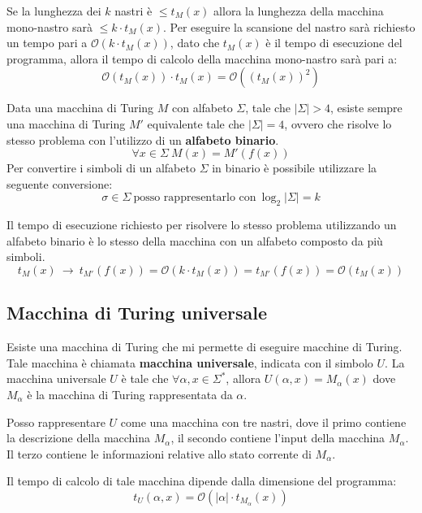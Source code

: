 Se la lunghezza dei $k$ nastri è $\leq t_M(x)$ allora la lunghezza della macchina mono-nastro sarà $\leq k \cdot t_M(x)$. Per eseguire la scansione del nastro sarà richiesto un tempo pari a $\mathcal{O}(k \cdot t_M(x))$, dato che $t_M(x)$ è il tempo di esecuzione del programma, allora il tempo di calcolo della macchina mono-nastro sarà pari a: 
\begin{equation}
    \mathcal{O}(t_M(x)) \cdot t_M(x) = \mathcal{O}((t_M(x))^2)
\end{equation}

Data una macchina di Turing $M$ con alfabeto $\Sigma$, tale che $|\Sigma| > 4$, esiste sempre una macchina di Turing $M'$ equivalente tale che $|\Sigma| = 4$, ovvero che risolve lo stesso problema con l'utilizzo di un \textbf{alfabeto binario}.
\begin{equation}
    \forall x \in \Sigma \ M(x) = M'(f(x))
\end{equation}
Per convertire i simboli di un alfabeto $\Sigma$ in binario è possibile utilizzare la seguente conversione:
\begin{equation}
    \sigma \in \Sigma \ \text{posso rappresentarlo con} \ \log_{2}|\Sigma | = k
\end{equation}

Il tempo di esecuzione richiesto per risolvere lo stesso problema utilizzando un alfabeto binario è lo stesso della macchina con un alfabeto composto da più simboli.
\begin{equation}
    t_M(x) \ \to \ t_{M'}(f(x)) = \mathcal{O}(k \cdot t_M(x)) = t_{M'}(f(x)) = \mathcal{O}(t_M(x))
\end{equation}
\subsection{Macchina di Turing universale}
Esiste una macchina di Turing che mi permette di eseguire macchine di Turing. Tale macchina è chiamata \textbf{macchina universale}, indicata con il simbolo $U$. La macchina universale $U$ è tale che $\forall \alpha, x \in \Sigma^{\ast}$, allora $U(\alpha, x) = M_{\alpha}(x)$ dove $M_{\alpha}$ è la macchina di Turing rappresentata da $\alpha$.

Posso rappresentare $U$ come una macchina con tre nastri, dove il primo contiene la descrizione della macchina $M_{\alpha}$, il secondo contiene l'input della macchina $M_{\alpha}$. Il terzo contiene le informazioni relative allo stato corrente di $M_{\alpha}$.

Il tempo di calcolo di tale macchina dipende dalla dimensione del programma:
\begin{equation}
    t_U(\alpha, x) = \mathcal{O}(|\alpha| \cdot t_{M_{\alpha}}(x))
\end{equation}
